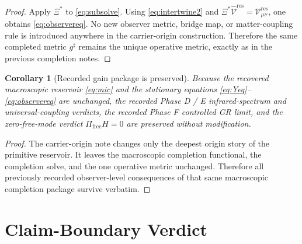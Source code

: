 \documentclass[11pt]{article}
\newcommand{\ObserverMap}{\Xi}
\newcommand{\CompletedMetric}{g^{\sharp}}
\newcommand{\ResidualCore}{\mathcal V_{\mu\nu}^{\mathrm{res}}}
\newcommand{\ResidualLift}{\widehat{\mathcal V}^{\mathrm{res}}}
\newtheorem{corollary}{Corollary}
\begin{document}
\begin{proof}
Apply \(\ObserverMap^*\) to \eqref{eq:subsolve}. Using \eqref{eq:intertwine2} and \(\ObserverMap^*\ResidualLift=\ResidualCore\), one obtains \eqref{eq:observereq}. No new observer metric, bridge map, or matter-coupling rule is introduced anywhere in the carrier-origin construction. Therefore the same completed metric \(\CompletedMetric\) remains the unique operative metric, exactly as in the previous completion notes.
\end{proof}

\begin{corollary}[Recorded gain package is preserved]
\label{cor:gains}
Because the recovered macroscopic reservoir \eqref{eq:mic} and the stationary equations \eqref{eq:Yeq}--\eqref{eq:observereq} are unchanged, the recorded Phase D / E infrared-spectrum and universal-coupling verdicts, the recorded Phase F controlled GR limit, and the zero-free-mode verdict \(\Pi_{\mathrm{free}}H=0\) are preserved without modification.
\end{corollary}

\begin{proof}
The carrier-origin note changes only the deepest origin story of the primitive reservoir. It leaves the macroscopic completion functional, the completion solve, and the one operative metric unchanged. Therefore all previously recorded observer-level consequences of that same macroscopic completion package survive verbatim.
\end{proof}

\section{Claim-Boundary Verdict}
\end{document}
